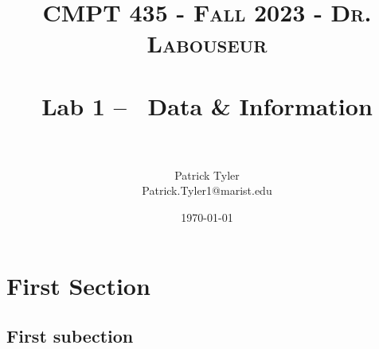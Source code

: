 \documentclass[letterpaper, 10pt]{article}
\title{	
   \normalfont \normalsize 
   \textsc{CMPT 435 - Fall 2023 - Dr. Labouseur} \\[10pt] %
   \horrule{0.5pt} \\[0.25cm] 	%
   \huge Lab 1 -- ~Data \& Information\\     	    %
   \horrule{0.5pt} \\[0.25cm] 	%
}
\author{Patrick Tyler \\ \normalsize Patrick.Tyler1@marist.edu}
\date{\normalsize\today} 	%
\begin{document}
\maketitle %


\section{First Section}
\subsection{First subection}
\end{document}
